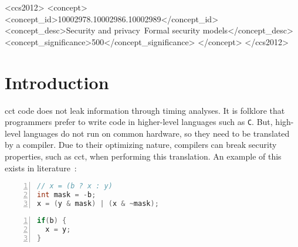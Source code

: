 \documentclass[acmsmall,review,screen,dvipsnames]{acmart}
\begin{document}
\begin{CCSXML}
<ccs2012>
  <concept>
  <concept_id>10002978.10002986.10002989</concept_id>
  <concept_desc>Security and privacy~Formal security models</concept_desc>
  <concept_significance>500</concept_significance>
  </concept>
</ccs2012>
\end{CCSXML}


\maketitle

\section{Introduction}

\gls{cct} code does not leak information through timing analyses.
It is folklore that programmers prefer to write code in higher-level languages such as \verb|C|.
But, high-level languages do not run on common hardware, so they need to be translated by a compiler.
Due to their optimizing nature, compilers can break security properties, such as \gls{cct}, when performing this translation.
An example of this exists in literature~\cite{barthe2018sec}:

\begin{minipage}{0.49\textwidth}
  \begin{lstlisting}[language=c,caption={Before Compilation},numbers=left]
// x = (b ? x : y)
int mask = -b;
x = (y & mask) | (x & ~mask);
  \end{lstlisting}
\end{minipage}%
\begin{minipage}{0.49\textwidth}
  \begin{lstlisting}[language=c,caption={After Compilation},numbers=left]
if(b) {
  x = y;
}
  \end{lstlisting}
\end{minipage}
\end{document}
